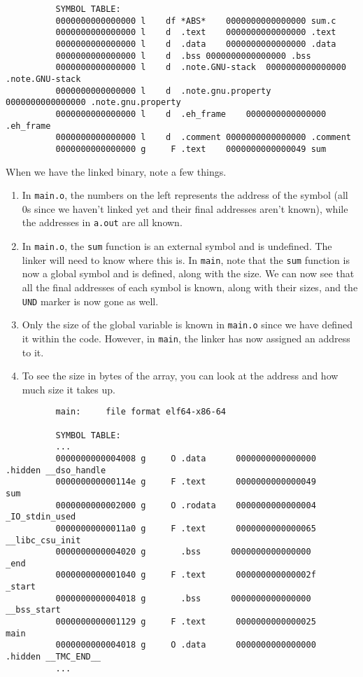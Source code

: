 \begin{example}
\begin{lstlisting}
          SYMBOL TABLE:
          0000000000000000 l    df *ABS*	0000000000000000 sum.c
          0000000000000000 l    d  .text	0000000000000000 .text
          0000000000000000 l    d  .data	0000000000000000 .data
          0000000000000000 l    d  .bss	0000000000000000 .bss
          0000000000000000 l    d  .note.GNU-stack	0000000000000000 .note.GNU-stack
          0000000000000000 l    d  .note.gnu.property	0000000000000000 .note.gnu.property
          0000000000000000 l    d  .eh_frame	0000000000000000 .eh_frame
          0000000000000000 l    d  .comment	0000000000000000 .comment
          0000000000000000 g     F .text	0000000000000049 sum
        \end{lstlisting}
        When we have the linked binary, note a few things. 
        \begin{enumerate}
          \item In \texttt{main.o}, the numbers on the left represents the address of the symbol (all 0s since we haven't linked yet and their final addresses aren't known), while the addresses in \texttt{a.out} are all known. 
          \item In \texttt{main.o}, the \texttt{sum} function is an external symbol and is undefined. The linker will need to know where this is. In \texttt{main}, note that the \texttt{sum} function is now a global symbol and is defined, along with the size. We can now see that all the final addresses of each symbol is known, along with their sizes, and the \texttt{UND} marker is now gone as well. 
          \item Only the size of the global variable is known in \texttt{main.o} since we have defined it within the code. However, in \texttt{main}, the linker has now assigned an address to it.
          \item To see the size in bytes of the array, you can look at the address and how much size it takes up. 
        \end{enumerate}
        \begin{lstlisting}
          main:     file format elf64-x86-64

          SYMBOL TABLE:
          ...
          0000000000004008 g     O .data	  0000000000000000              .hidden __dso_handle
          000000000000114e g     F .text	  0000000000000049              sum
          0000000000002000 g     O .rodata	  0000000000000004              _IO_stdin_used
          00000000000011a0 g     F .text	  0000000000000065              __libc_csu_init
          0000000000004020 g       .bss	     0000000000000000              _end
          0000000000001040 g     F .text	  000000000000002f              _start
          0000000000004018 g       .bss	     0000000000000000              __bss_start
          0000000000001129 g     F .text	  0000000000000025              main
          0000000000004018 g     O .data	  0000000000000000              .hidden __TMC_END__
          ...
        \end{lstlisting}
      \end{example}

